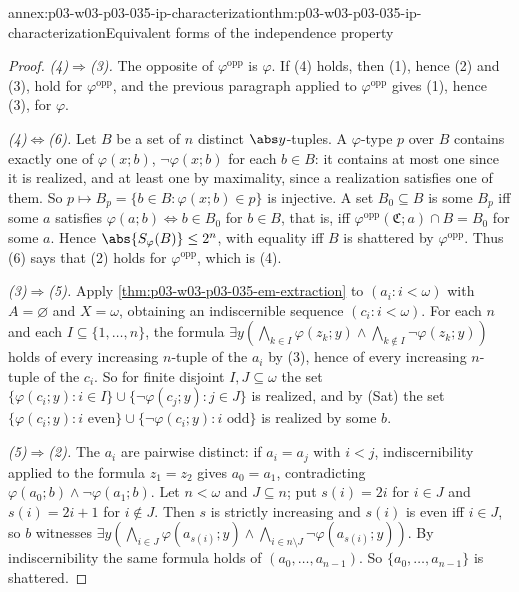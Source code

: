 \begin{annexitem}{annex:p03-w03-p03-035-ip-characterization}{thm:p03-w03-p03-035-ip-characterization}{Equivalent forms of the independence property}
\begin{proof}
\emph{(4)\(\Rightarrow\)(3).}  The opposite of \(\varphi^{\mathrm{opp}}\) is
\(\varphi\).  If (4) holds, then (1), hence (2) and (3), hold for
\(\varphi^{\mathrm{opp}}\), and the previous paragraph applied to
\(\varphi^{\mathrm{opp}}\) gives (1), hence (3), for \(\varphi\).

\emph{(4)\(\Leftrightarrow\)(6).}  Let \(B\) be a set of \(n\) distinct
\(\abs y\)-tuples.  A \(\varphi\)-type \(p\) over \(B\) contains exactly one of
\(\varphi(x;b)\), \(\neg\varphi(x;b)\) for each \(b\in B\): it contains at
most one since it is realized, and at least one by maximality, since a
realization satisfies one of them.  So \(p\mapsto
B_p=\{b\in B:\varphi(x;b)\in p\}\) is injective.  A set \(B_0\subseteq B\) is
some \(B_p\) iff some \(a\) satisfies \(\varphi(a;b)\Leftrightarrow b\in B_0\)
for \(b\in B\), that is, iff \(\varphi^{\mathrm{opp}}(\mathfrak C;a)\cap
B=B_0\) for some \(a\).  Hence \(\abs{S_\varphi(B)}\leq2^n\), with equality
iff \(B\) is shattered by \(\varphi^{\mathrm{opp}}\).  Thus (6) says that
(2) holds for \(\varphi^{\mathrm{opp}}\), which is (4).

\emph{(3)\(\Rightarrow\)(5).}  Apply
\cref{thm:p03-w03-p03-035-em-extraction} to \((a_i:i<\omega)\) with
\(A=\varnothing\) and \(X=\omega\), obtaining an indiscernible sequence
\((c_i:i<\omega)\).  For each \(n\) and each \(I\subseteq\{1,\ldots,n\}\),
the formula
\(\exists y(\bigwedge_{k\in I}\varphi(z_k;y)\wedge\bigwedge_{k\notin I}\neg\varphi(z_k;y))\)
holds of every increasing \(n\)-tuple of the \(a_i\) by (3), hence of every
increasing \(n\)-tuple of the \(c_i\).  So for finite disjoint
\(I,J\subseteq\omega\) the set \(\{\varphi(c_i;y):i\in I\}\cup
\{\neg\varphi(c_j;y):j\in J\}\) is realized, and by (Sat) the set
\(\{\varphi(c_i;y):i\text{ even}\}\cup\{\neg\varphi(c_i;y):i\text{ odd}\}\) is
realized by some \(b\).

\emph{(5)\(\Rightarrow\)(2).}  The \(a_i\) are pairwise distinct: if
\(a_i=a_j\) with \(i<j\), indiscernibility applied to the formula
\(z_1=z_2\) gives \(a_0=a_1\), contradicting \(\varphi(a_0;b)\wedge
\neg\varphi(a_1;b)\).  Let \(n<\omega\) and \(J\subseteq n\); put
\(s(i)=2i\) for \(i\in J\) and \(s(i)=2i+1\) for \(i\notin J\).  Then \(s\) is
strictly increasing and \(s(i)\) is even iff \(i\in J\), so \(b\) witnesses
\(\exists y(\bigwedge_{i\in J}\varphi(a_{s(i)};y)\wedge
\bigwedge_{i\in n\setminus J}\neg\varphi(a_{s(i)};y))\).  By indiscernibility
the same formula holds of \((a_0,\ldots,a_{n-1})\).  So
\(\{a_0,\ldots,a_{n-1}\}\) is shattered.
\end{proof}
\end{annexitem}

